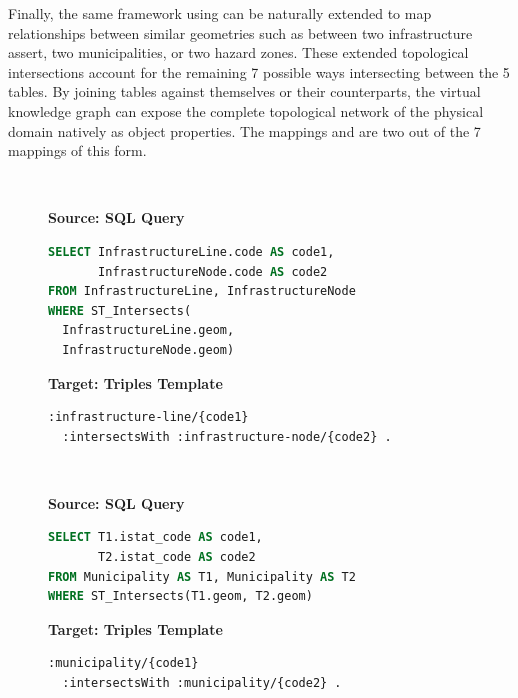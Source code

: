 Finally, the same framework using  can be naturally extended to map relationships between similar geometries such as between two infrastructure assert, two municipalities, or two hazard zones. These extended topological intersections account for the remaining 7 possible ways intersecting between the 5 tables. By joining tables against themselves or their counterparts, the virtual knowledge graph can expose the complete topological network of the physical domain natively as object properties. The mappings  and  are two out of the 7 mappings of this form.

\begin{figure}[ht!]
  \vspace*{-1mm}
  \textbf{\small{}} \\
  \begin{minipage}[t]{0.50\textwidth}
    \centering
    \textbf{\scriptsize Source: SQL Query}
\begin{lstlisting}[language=SQL]
SELECT InfrastructureLine.code AS code1,
       InfrastructureNode.code AS code2
FROM InfrastructureLine, InfrastructureNode
WHERE ST_Intersects(
  InfrastructureLine.geom,
  InfrastructureNode.geom)
\end{lstlisting}
  \end{minipage}
  \hfill
  \begin{minipage}[t]{0.50\textwidth}
    \centering
    \textbf{\scriptsize Target: Triples Template}
\begin{lstlisting}[language=Turtle]
:infrastructure-line/{code1}
  :intersectsWith :infrastructure-node/{code2} . 
\end{lstlisting}
  \end{minipage}
  \vspace*{-4mm}
\end{figure}

\begin{figure}[ht!]
  \vspace*{-1mm}
  \textbf{\small{}} \\
  \begin{minipage}[t]{0.50\textwidth}
    \centering
    \textbf{\scriptsize Source: SQL Query}
\begin{lstlisting}[language=SQL]
SELECT T1.istat_code AS code1,
       T2.istat_code AS code2
FROM Municipality AS T1, Municipality AS T2
WHERE ST_Intersects(T1.geom, T2.geom)
\end{lstlisting}
  \end{minipage}
  \hfill
  \begin{minipage}[t]{0.50\textwidth}
    \centering
    \textbf{\scriptsize Target: Triples Template}
\begin{lstlisting}[language=Turtle]
:municipality/{code1}
  :intersectsWith :municipality/{code2} . 
\end{lstlisting}
  \end{minipage}
  \vspace*{-4mm}
\end{figure}

